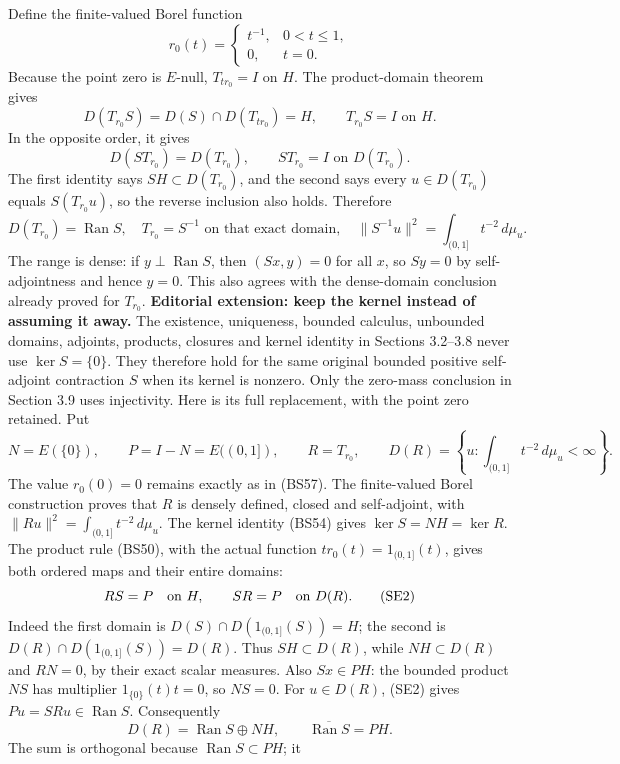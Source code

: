\documentclass[
  11pt,
]{article}
\begin{document}
Define the finite-valued Borel function \[
 r_0(t)=\begin{cases}t^{-1},&0<t\leq1,\\0,&t=0.\end{cases}
 \tag{BS57}
\] Because the point zero is \(E\)-null, \(T_{tr_0}=I\) on \(H\). The
product-domain theorem gives \[
 D(T_{r_0}S)=D(S)\cap D(T_{tr_0})=H,
 \qquad T_{r_0}S=I\text{ on }H.
\] In the opposite order, it gives \[
 D(ST_{r_0})=D(T_{r_0}),\qquad ST_{r_0}=I\text{ on }D(T_{r_0}).
\] The first identity says \(SH\subset D(T_{r_0})\), and the second says
every \(u\in D(T_{r_0})\) equals \(S(T_{r_0}u)\), so the reverse
inclusion also holds. Therefore \[
 D(T_{r_0})=\operatorname{Ran}S,
 \quad T_{r_0}=S^{-1}\text{ on that exact domain},
 \quad\|S^{-1}u\|^2=\int_{(0,1]}t^{-2}\,d\mu_u.
 \tag{BS58}
\] The range is dense: if \(y\perp\operatorname{Ran}S\), then
\((Sx,y)=0\) for all \(x\), so \(Sy=0\) by self-adjointness and hence
\(y=0\). This also agrees with the dense-domain conclusion already
proved for \(T_{r_0}\). \textbf{Editorial extension: keep the kernel
instead of assuming it away.} The existence, uniqueness, bounded
calculus, unbounded domains, adjoints, products, closures and kernel
identity in Sections 3.2--3.8 never use \(\ker S=\{0\}\). They therefore
hold for the same original bounded positive self-adjoint contraction
\(S\) when its kernel is nonzero. Only the zero-mass conclusion in
Section 3.9 uses injectivity. Here is its full replacement, with the
point zero retained. Put \[
 N=E(\{0\}),\qquad P=I-N=E((0,1]),\qquad
 R=T_{r_0},\qquad
 D(R)=\left\{u:\int_{(0,1]}t^{-2}\,d\mu_u<\infty\right\}.
 \tag{SE1}
\] The value \(r_0(0)=0\) remains exactly as in (BS57). The
finite-valued Borel construction proves that \(R\) is densely defined,
closed and self-adjoint, with \(\|Ru\|^2=\int_{(0,1]}t^{-2}\,d\mu_u\).
The kernel identity (BS54) gives \(\ker S=NH=\ker R\). The product rule
(BS50), with the actual function \(t r_0(t)=1_{(0,1]}(t)\), gives both
ordered maps and their entire domains: \[
 RS=P\quad\hbox{on }H,\qquad
 SR=P\quad\hbox{on }D(R).
 \tag{SE2}
\] Indeed the first domain is \(D(S)\cap D(1_{(0,1]}(S))=H\); the second
is \(D(R)\cap D(1_{(0,1]}(S))=D(R)\). Thus \(SH\subset D(R)\), while
\(NH\subset D(R)\) and \(RN=0\), by their exact scalar measures. Also
\(Sx\in PH\): the bounded product \(NS\) has multiplier
\(1_{\{0\}}(t)t=0\), so \(NS=0\). For \(u\in D(R)\), (SE2) gives
\(Pu=SRu\in\operatorname{Ran}S\). Consequently \[
 D(R)=\operatorname{Ran}S\oplus NH,
 \qquad \overline{\operatorname{Ran}S}=PH.
 \tag{SE3}
\] The sum is orthogonal because \(\operatorname{Ran}S\subset PH\); it
\end{document}
